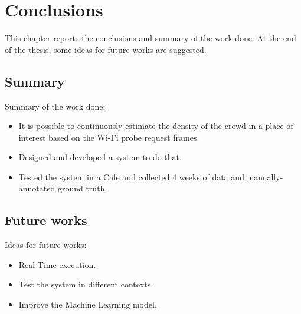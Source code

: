 \chapter{Conclusions}
\label{cha:conclusions}
\vspace{0.4 cm} 

This chapter reports the conclusions and summary of the work done. At the end of the thesis, some ideas for future works are suggested.


\section{Summary}
\label{sec:future}
\vspace{0.2 cm} 

Summary of the work done:
\begin{itemize}
  \item It is possible to continuously estimate the density of the crowd in a place of interest based on the Wi-Fi probe request frames.
  \item Designed and developed a system to do that.
  \item Tested the system in a Cafe and collected 4 weeks of data and manually-annotated ground truth.
\end{itemize}


\section{Future works}
\label{sec:future}
\vspace{0.2 cm} 

Ideas for future works:
\begin{itemize}
  \item Real-Time execution.
  \item Test the system in different contexts.
  \item Improve the Machine Learning model.
\end{itemize}
